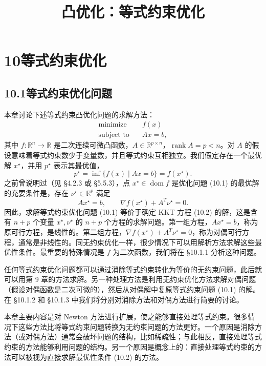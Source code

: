 \documentclass[UTF8, 12pt, fontset=fandol, oneside]{ctexart}
\title{凸优化：等式约束优化}
\author{}
\date{}
\begin{document}
\maketitle

\section*{10\quad 等式约束优化}

\subsection*{10.1\quad 等式约束优化问题}

本章讨论下述等式约束凸优化问题的求解方法：
\begin{equation}
\begin{aligned}
\text{minimize}\quad & f(x)\\
\text{subject to}\quad & Ax=b,
\end{aligned}
\tag{10.1}
\end{equation}
其中 $f:\mathbb{R}^n\to\mathbb{R}$ 是二次连续可微凸函数，$A\in\mathbb{R}^{p\times n}$，$\operatorname{rank}A=p<n$。对 $A$ 的假设意味着等式约束数少于变量数，并且等式约束互相独立。我们假定存在一个最优解 $x^\star$，并用 $p^\star$ 表示其最优值，
\[
p^\star=\inf\{f(x)\mid Ax=b\}=f(x^\star).
\]
之前曾说明过（见 \S4.2.3 或 \S5.5.3），点 $x^\star\in\operatorname{dom} f$ 是优化问题 (10.1) 的最优解的充要条件是，存在 $\nu^\star\in\mathbb{R}^p$ 满足
\begin{equation}
Ax^\star=b,\qquad \nabla f(x^\star)+A^T\nu^\star=0.
\tag{10.2}
\end{equation}
因此，求解等式约束优化问题 (10.1) 等价于确定 KKT 方程 (10.2) 的解，这是含有 $n+p$ 个变量 $x^\star,\nu^\star$ 的 $n+p$ 个方程的求解问题。第一组方程，$Ax^\star=b$，称为原可行方程，是线性的。第二组方程，$\nabla f(x^\star)+A^T\nu^\star=0$，称为对偶可行方程，通常是非线性的。同无约束优化一样，很少情况下可以用解析方法求解这些最优性条件。最重要的特殊情况是 $f$ 为二次函数，我们将在 \S10.1.1 分析这种问题。

任何等式约束优化问题都可以通过消除等式约束转化为等价的无约束问题，此后就可以用第 9 章的方法求解。另一种处理方法是利用无约束优化方法求解对偶问题（假设对偶函数是二次可微的），然后从对偶解中复原等式约束问题 (10.1) 的解。在 \S10.1.2 和 \S10.1.3 中我们将分别对消除方法和对偶方法进行简要的讨论。

本章主要内容是对 Newton 方法进行扩展，使之能够直接处理等式约束。很多情况下这些方法比将等式约束问题转换为无约束问题的方法更好。一个原因是消除方法（或对偶方法）通常会破坏问题的结构，比如稀疏性；与此相反，直接处理等式约束的方法能够利用问题的结构。另一个原因是概念上的：直接处理等式约束的方法可以被视为直接求解最优性条件 (10.2) 的方法。
\end{document}
